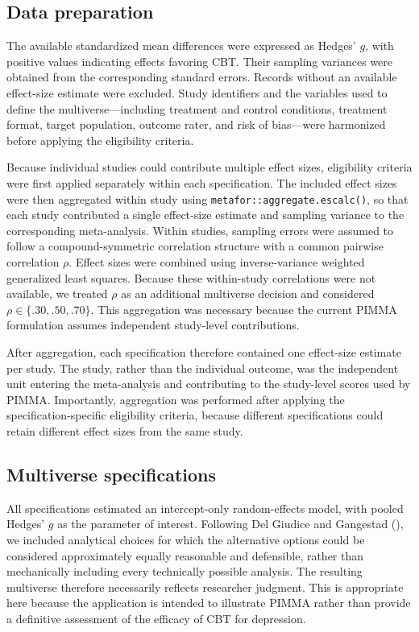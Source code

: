\documentclass[
  man,
  longtable,
  nolmodern,
  notxfonts,
  notimes,
  colorlinks=true,linkcolor=blue,citecolor=blue,urlcolor=blue]{apa7}
\begin{document}
\subsection{Data preparation}\label{data-preparation}

The available standardized mean differences were expressed as Hedges'
\(g\), with positive values indicating effects favoring CBT. Their
sampling variances were obtained from the corresponding standard errors.
Records without an available effect-size estimate were excluded. Study
identifiers and the variables used to define the multiverse---including
treatment and control conditions, treatment format, target population,
outcome rater, and risk of bias---were harmonized before applying the
eligibility criteria.

Because individual studies could contribute multiple effect sizes,
eligibility criteria were first applied separately within each
specification. The included effect sizes were then aggregated within
study using \texttt{metafor::aggregate.escalc()}, so that each study
contributed a single effect-size estimate and sampling variance to the
corresponding meta-analysis. Within studies, sampling errors were
assumed to follow a compound-symmetric correlation structure with a
common pairwise correlation \(\rho\). Effect sizes were combined using
inverse-variance weighted generalized least squares. Because these
within-study correlations were not available, we treated \(\rho\) as an
additional multiverse decision and considered
\(\rho \in \{.30, .50, .70\}\). This aggregation was necessary because
the current PIMMA formulation assumes independent study-level
contributions.

After aggregation, each specification therefore contained one
effect-size estimate per study. The study, rather than the individual
outcome, was the independent unit entering the meta-analysis and
contributing to the study-level scores used by PIMMA. Importantly,
aggregation was performed after applying the specification-specific
eligibility criteria, because different specifications could retain
different effect sizes from the same study.

\subsection{Multiverse specifications}\label{multiverse-specifications}

All specifications estimated an intercept-only random-effects model,
with pooled Hedges' \(g\) as the parameter of interest. Following Del
Giudice and Gangestad (), we
included analytical choices for which the alternative options could be
considered approximately equally reasonable and defensible, rather than
mechanically including every technically possible analysis. The
resulting multiverse therefore necessarily reflects researcher judgment.
This is appropriate here because the application is intended to
illustrate PIMMA rather than provide a definitive assessment of the
efficacy of CBT for depression.
\end{document}

